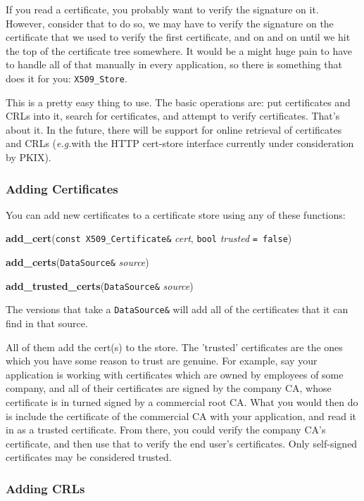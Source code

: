\documentclass{article}
\newcommand{\function}[1]{\textbf{#1}}
\newcommand{\type}[1]{\texttt{#1}}
\renewcommand{\arg}[1]{\textsl{#1}}
\newcommand{\eg}[0]{\emph{e.g.}}
\begin{document}
If you read a certificate, you probably want to verify the signature on
it. However, consider that to do so, we may have to verify the signature on the
certificate that we used to verify the first certificate, and on and on until
we hit the top of the certificate tree somewhere. It would be a might huge pain
to have to handle all of that manually in every application, so there is
something that does it for you: \type{X509\_Store}.

This is a pretty easy thing to use. The basic operations are: put certificates
and CRLs into it, search for certificates, and attempt to verify
certificates. That's about it. In the future, there will be support for online
retrieval of certificates and CRLs (\eg with the HTTP cert-store interface
currently under consideration by PKIX).

\subsubsection{Adding Certificates}

You can add new certificates to a certificate store using any of these
functions:

\function{add\_cert}(\type{const X509\_Certificate\&} \arg{cert},
                     \type{bool} \arg{trusted} \type{= false})

\function{add\_certs}(\type{DataSource\&} \arg{source})

\function{add\_trusted\_certs}(\type{DataSource\&} \arg{source})

The versions that take a \type{DataSource\&} will add all of the certificates
that it can find in that source.

All of them add the cert(s) to the store. The 'trusted' certificates are the
ones which you have some reason to trust are genuine. For example, say your
application is working with certificates which are owned by employees of some
company, and all of their certificates are signed by the company CA, whose
certificate is in turned signed by a commercial root CA. What you would then do
is include the certificate of the commercial CA with your application, and read
it in as a trusted certificate. From there, you could verify the company CA's
certificate, and then use that to verify the end user's certificates. Only
self-signed certificates may be considered trusted.

\subsubsection{Adding CRLs}
\end{document}
